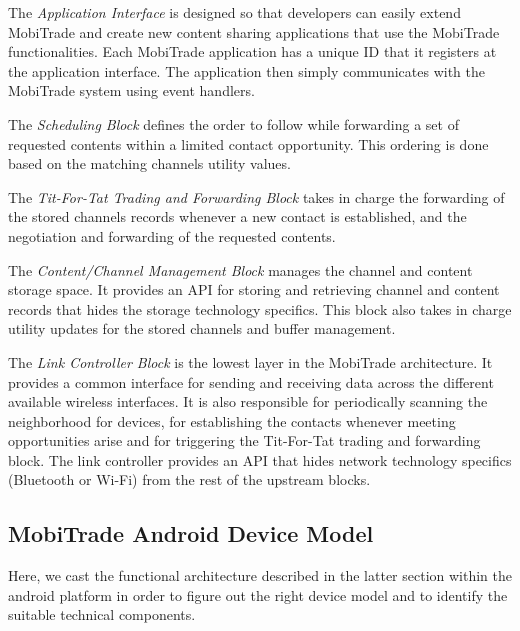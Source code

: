 The \textit{Application Interface} is designed so that developers can easily extend MobiTrade and create new content sharing applications that use the MobiTrade functionalities. Each MobiTrade application has a unique ID that it registers at the application interface. The application then simply communicates with the MobiTrade system using event handlers.

The \textit{Scheduling Block} defines the order to follow while forwarding a set of requested contents within a limited contact opportunity. This ordering is done based on the matching channels utility values.

The \textit{Tit-For-Tat Trading and Forwarding Block} takes in charge the forwarding of the stored channels records whenever a new contact is established, and the negotiation and forwarding of the requested contents.

The \textit{Content/Channel Management Block} manages the channel and content storage space. It provides an API for storing and retrieving channel and content records that hides the storage technology specifics. This block also takes in charge utility updates for the stored channels and buffer management.

The \textit{Link Controller Block} is the lowest layer in the MobiTrade architecture. It provides a common interface for sending and receiving data across the different available wireless interfaces. It is also responsible for periodically scanning the neighborhood for devices, for establishing the contacts whenever meeting opportunities arise and for triggering the Tit-For-Tat trading and forwarding block. The link controller provides an API that hides network technology specifics (Bluetooth or Wi-Fi) from the rest of the upstream blocks.

\subsection{MobiTrade Android Device Model}
\label{MobiTrade-device-model}
 
Here, we  cast the functional architecture described in the latter section within the android platform in order to figure out the right device model and to identify the suitable technical components. 

